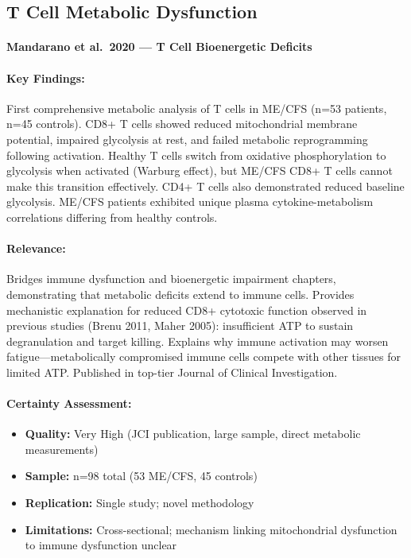\subsection{T Cell Metabolic Dysfunction}

\paragraph{Mandarano et al.\ 2020 --- T Cell Bioenergetic Deficits}

\cite{Mandarano2020}

\paragraph{Key Findings:}
First comprehensive metabolic analysis of T cells in ME/CFS (n=53 patients, n=45 controls). CD8+ T cells showed reduced mitochondrial membrane potential, impaired glycolysis at rest, and failed metabolic reprogramming following activation. Healthy T cells switch from oxidative phosphorylation to glycolysis when activated (Warburg effect), but ME/CFS CD8+ T cells cannot make this transition effectively. CD4+ T cells also demonstrated reduced baseline glycolysis. ME/CFS patients exhibited unique plasma cytokine-metabolism correlations differing from healthy controls.

\paragraph{Relevance:}
Bridges immune dysfunction and bioenergetic impairment chapters, demonstrating that metabolic deficits extend to immune cells. Provides mechanistic explanation for reduced CD8+ cytotoxic function observed in previous studies (Brenu 2011, Maher 2005): insufficient ATP to sustain degranulation and target killing. Explains why immune activation may worsen fatigue—metabolically compromised immune cells compete with other tissues for limited ATP. Published in top-tier Journal of Clinical Investigation.

\paragraph{Certainty Assessment:}
\begin{itemize}
    \item \textbf{Quality:} Very High (JCI publication, large sample, direct metabolic measurements)
    \item \textbf{Sample:} n=98 total (53 ME/CFS, 45 controls)
    \item \textbf{Replication:} Single study; novel methodology
    \item \textbf{Limitations:} Cross-sectional; mechanism linking mitochondrial dysfunction to immune dysfunction unclear
\end{itemize}

